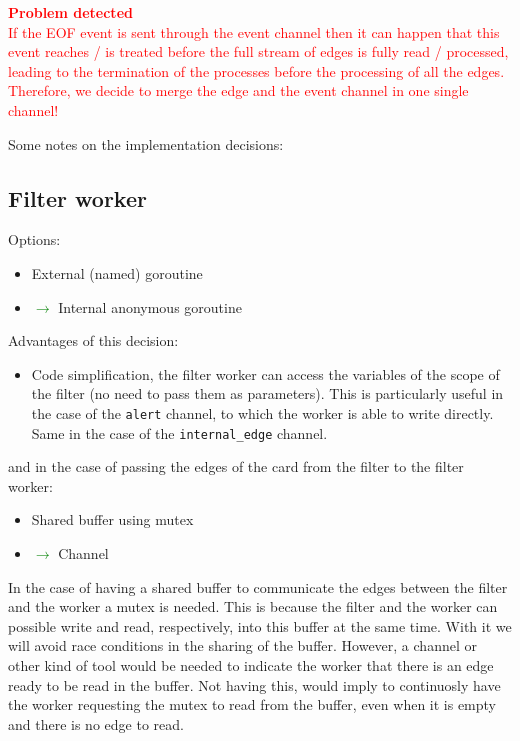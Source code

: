 \documentclass{article}
\begin{document}
\textcolor{red}{\textbf{Problem detected}\\
If the EOF event is sent through the event channel then it can happen that this event reaches / is treated before the full stream of edges is fully read / processed, leading to
the termination of the processes before the processing of all the edges.\\
Therefore, we decide to merge the edge and the event channel in one single channel!}


Some notes on the implementation decisions:

\subsection{Filter worker}

Options:

\begin{itemize}
  \item External (named) goroutine
  \item \textcolor{green}{$\rightarrow$} Internal anonymous goroutine
\end{itemize}

Advantages of this decision:
\begin{itemize}
  \item Code simplification, the filter worker can access the variables of the scope of the
  filter (no need to pass them as parameters). This is particularly useful in the case of the \texttt{alert} channel, to which the worker is able to write directly. Same in the case of the \texttt{internal\_edge} channel.
\end{itemize}

and in the case of passing the edges of the card from the filter to the filter worker:
\begin{itemize}
  \item Shared buffer using mutex
  \item \textcolor{green}{$\rightarrow$} Channel 
\end{itemize}

In the case of having a shared buffer to communicate the edges between the filter and the worker a mutex is needed. This is because the filter and the worker can possible write and read, respectively, into this buffer at the same time. With it we will avoid race conditions in the sharing of the buffer. However, a channel or other kind of tool would be needed to indicate the worker that there is an edge ready to be read in the buffer. Not having this, would imply to continuosly have the worker requesting the mutex to read from the buffer, even when it is empty and there is no edge to read. 
\end{document}
